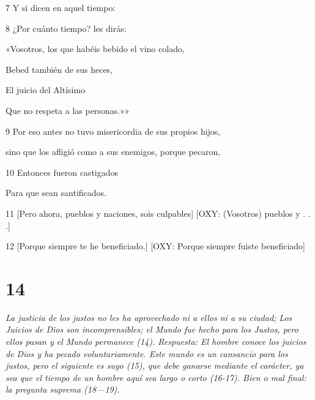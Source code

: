 \par 7 Y si dicen en aquel tiempo:

\par 8 ¿Por cuánto tiempo? les dirás:

\par «Vosotros, los que habéis bebido el vino colado,

\par Bebed también de sus heces,

\par El juicio del Altísimo

\par Que no respeta a las personas.»»

\par 9 Por eso antes no tuvo misericordia de sus propios hijos,

\par sino que los afligió como a sus enemigos, porque pecaron,

\par 10 Entonces fueron castigados

\par Para que sean santificados.

\par 11 [Pero ahora, pueblos y naciones, sois culpables] [OXY: (Vosotros) pueblos y . . .]

\par [Porque siempre habéis hollado la tierra,] [OXY: (Vosotros) habéis hollado la tierra]

\par [Y usó la creación injustamente.] [OXY: Y usó mal las cosas creadas en ella.]

\par 12 [Porque siempre te he beneficiado.] [OXY: Porque siempre fuiste beneficiado]

\par [Y siempre has sido desagradecido por la beneficencia.] [OXY: Pero siempre fuiste desagradecido.]

\chapter{14}

\par \textit{La justicia de los justos no les ha aprovechado ni a ellos ni a su ciudad; Los Juicios de Dios son incomprensibles; el Mundo fue hecho para los Justos, pero ellos pasan y el Mundo permanece (14). Respuesta: El hombre conoce los juicios de Dios y ha pecado voluntariamente. Este mundo es un cansancio para los justos, pero el siguiente es suyo (15), que debe ganarse mediante el carácter, ya sea que el tiempo de un hombre aquí sea largo o corto (16-17). Bien o mal final: la pregunta suprema (18—19).}

